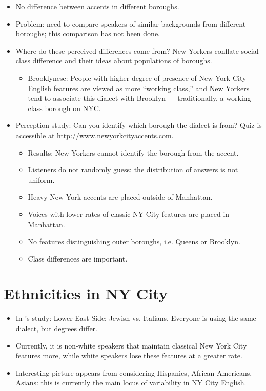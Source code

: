 \documentclass[11pt]{article}
\newcommand{\citeposs}[1]{\citeauthor{#1}'s \citeyear{#1}}
\newcommand{\1}{$'$}
\newcommand{\2}{$''$}
\newcommand{\3}{$'''$}
\begin{document}
\begin{itemize}
	\item No difference between accents in different boroughs.
	\item Problem: need to compare speakers of similar backgrounds from different boroughs; this comparison has not been done.
	\item Where do these perceived differences come from? New Yorkers conflate social class difference and their ideas about populations of boroughs. 
		\begin{itemize}
			\item Brooklynese: People with higher degree of presence of New York City English features are viewed as more ``working class,'' and New Yorkers tend to associate this dialect with Brooklyn --- traditionally, a working class borough on NYC.
		\end{itemize}
	\item Perception study: Can you identify which borough the dialect is from? Quiz is accessible at \url{http://www.newyorkcityaccents.com}.
		\begin{itemize}
			\item Results: New Yorkers cannot identify the borough from the accent.
			\item Listeners do not randomly guess: the distribution of answers is not uniform.
			\item Heavy New York accents are placed outside of Manhattan. 
			\item Voices with lower rates of classic NY City features are placed in Manhattan.
			\item No features distinguishing outer boroughs, i.e. Queens or Brooklyn.
			\item Class differences are important.
		\end{itemize}
 \end{itemize}

\section{Ethnicities in NY City}

\begin{itemize}
	\item In \citeposs{Labov:1966} study: Lower East Side: Jewish vs. Italians. Everyone is using the same dialect, but degrees differ.
	\item Currently, it is non-white speakers that maintain classical New York City features more, while white speakers lose these features at a greater rate.
	\item Interesting picture appears from considering Hispanics, African-Americans, Asians: this is currently the main locus of variability in NY City English. 
\end{itemize}
\end{document}
